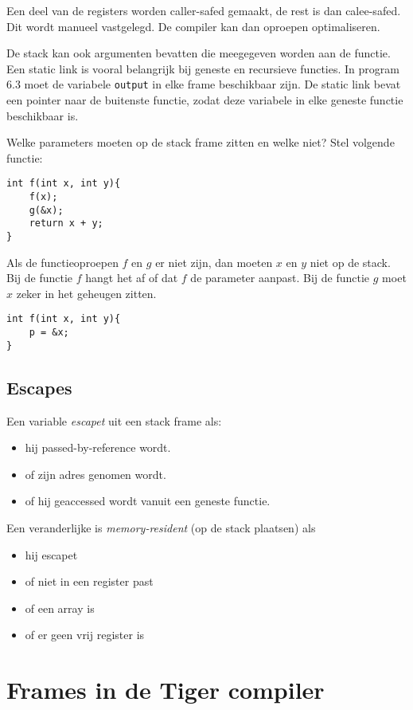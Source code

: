 Een deel van de registers worden caller-safed gemaakt, de rest is dan calee-safed. Dit wordt manueel vastgelegd. De compiler kan dan oproepen optimaliseren.

De stack kan ook argumenten bevatten die meegegeven worden aan de functie. Een static link is vooral belangrijk bij geneste en recursieve functies. In program 6.3 moet de variabele \texttt{output} in elke frame beschikbaar zijn. De static link bevat een pointer naar de buitenste functie, zodat deze variabele in elke geneste functie beschikbaar is.


Welke parameters moeten op de stack frame zitten en welke niet? Stel volgende functie:

\begin{lstlisting}
int f(int x, int y){
	f(x);
	g(&x);
	return x + y;
}
\end{lstlisting}

Als de functieoproepen $f$ en $g$ er niet zijn, dan moeten $x$ en $y$ niet op de stack. Bij de functie $f$ hangt het af of dat $f$ de parameter aanpast. Bij de functie $g$ moet $x$ zeker in het geheugen zitten.

\begin{lstlisting}
int f(int x, int y){
	p = &x;
}
\end{lstlisting}

\subsection{Escapes}
Een variable \textit{escapet} uit een stack frame als:
\begin{itemize}
	\item hij passed-by-reference wordt.
	\item of zijn adres genomen wordt.
	\item of hij geaccessed wordt vanuit een geneste functie.
\end{itemize}

Een veranderlijke is \textit{memory-resident} (op de stack plaatsen) als
\begin{itemize}
	\item hij escapet
	\item of niet in een register past
	\item of een array is
	\item of er geen vrij register is
\end{itemize}


\section{Frames in de Tiger compiler}
